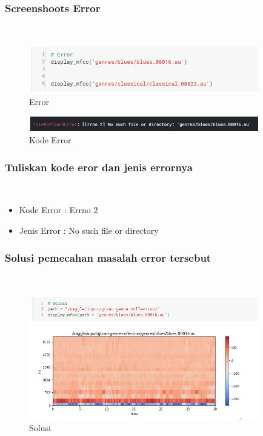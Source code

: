 	\subsubsection{Screenshoots Error}\hfill\\
	
	\begin{figure}[H]
		\begin{center}
		 \includegraphics[width=10cm]{figures/1174076/figures6/error1.png}
		 \caption{Error}	
		\end{center}
	\end{figure}
	
	\begin{figure}[H]
		\begin{center}
		 \includegraphics[width=10cm]{figures/1174076/figures6/error2.png}
		 \caption{Kode Error}	
		\end{center}
	\end{figure}
	
	
	\subsubsection{Tuliskan kode eror dan jenis errornya}\hfill\\
		\begin{itemize}
		\item Kode Error : Errno 2
		
		\item Jenis Error : No such file or directory
		
		\end{itemize}
	 
	\subsubsection{Solusi pemecahan masalah error tersebut}\hfill\\
	
	\begin{figure}[H]
		\begin{center}
		 \includegraphics[width=10cm]{figures/1174076/figures6/solusi.png}
		 \caption{Solusi}	
		\end{center}
	\end{figure}
	
